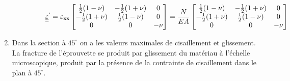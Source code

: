 \documentclass
[
a4paper,                      %
twoside,					  %
12pt,                         %
abstract,		      %
fleqn,                        %
]
{scrartcl} %
\begin{document}
\begin{enumerate}
\begin{itemize}
\begin{description}
\begin{equation}
\underline{\underline{\varepsilon}}^{`}=\varepsilon _{\text{xx}}\begin{bmatrix}
\frac{1}{2} (1-\nu )  & -\frac{1}{2} (1+\nu )  & 0 \\
 -\frac{1}{2} (1+\nu )  & \frac{1}{2} (1-\nu )  & 0 \\
 0 & 0 & -\nu   \\
\end{bmatrix}=\frac{N}{EA}\begin{bmatrix}
\frac{1}{2} (1-\nu )  & -\frac{1}{2} (1+\nu )  & 0 \\
 -\frac{1}{2} (1+\nu )  & \frac{1}{2} (1-\nu )  & 0 \\
 0 & 0 & -\nu   \\
\end{bmatrix}
\end{equation}

\end{description}


\end{itemize}

\item Dans la section \`a $45^{\circ}$ on a les valeurs maximales de cisaillement et glissement. La fracture de l'\'eprouvette se produit par glissement du mat\'eriau \`a l'\'echelle microscopique, produit par la pr\'esence de la contrainte de cisaillement dans le plan \`a $45^{\circ}$.
\end{enumerate}


%


%
%
%
\end{document}
